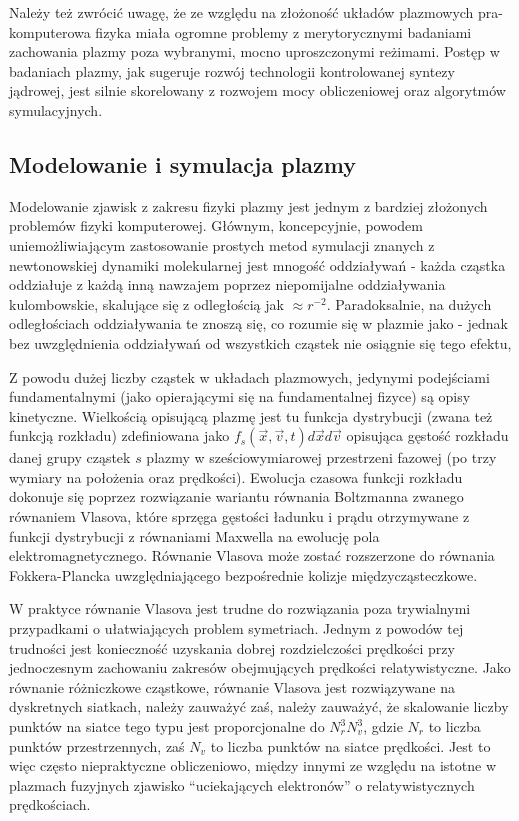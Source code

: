     Należy też zwrócić uwagę, że ze względu na złożoność układów plazmowych
    pra-komputerowa fizyka miała ogromne problemy z merytorycznymi badaniami
    zachowania plazmy poza wybranymi, mocno uproszczonymi reżimami. Postęp w
    badaniach plazmy, jak sugeruje rozwój technologii kontrolowanej syntezy
    jądrowej, jest silnie skorelowany z %
    rozwojem mocy obliczeniowej oraz algorytmów symulacyjnych.\cite{youtube-plasma-algorithm-progress}

    \subsection{Modelowanie i symulacja plazmy}

    Modelowanie zjawisk z zakresu fizyki plazmy jest jednym z bardziej
    złożonych problemów fizyki komputerowej. Głównym, koncepcyjnie, powodem
    uniemożliwiającym zastosowanie prostych metod symulacji znanych z
    newtonowskiej dynamiki molekularnej jest mnogość oddziaływań - każda
    cząstka oddziałuje z każdą inną nawzajem poprzez niepomijalne oddziaływania
    kulombowskie, skalujące się z odległością jak
    $\approx r^{-2}$. Paradoksalnie, na dużych odległościach oddziaływania
    te znoszą się, co rozumie się w plazmie jako  - jednak
    bez uwzględnienia oddziaływań od wszystkich cząstek nie osiągnie się tego
    efektu,

    Z powodu dużej liczby cząstek w układach plazmowych, jedynymi podejściami
    fundamentalnymi (jako opierającymi się na fundamentalnej fizyce) są opisy
    kinetyczne. Wielkością opisującą plazmę jest tu funkcja dystrybucji (zwana
    też funkcją rozkładu) zdefiniowana jako $f_s(\vec{x}, \vec{v}, t) d\vec{x}
    d\vec{v}$ opisująca gęstość rozkładu danej grupy cząstek $s$ plazmy w
    sześciowymiarowej przestrzeni fazowej (po trzy wymiary na położenia oraz
    prędkości). Ewolucja czasowa funkcji rozkładu dokonuje się poprzez
    rozwiązanie wariantu równania Boltzmanna zwanego równaniem Vlasova,
    które sprzęga gęstości ładunku i prądu otrzymywane z funkcji dystrybucji
    z równaniami Maxwella na ewolucję pola elektromagnetycznego. Równanie
    Vlasova może zostać rozszerzone do równania Fokkera-Plancka uwzględniającego
    bezpośrednie kolizje międzycząsteczkowe.

    W praktyce równanie Vlasova jest trudne do rozwiązania poza trywialnymi
    przypadkami o ułatwiających problem symetriach.  Jednym z powodów tej
    trudności jest konieczność uzyskania dobrej rozdzielczości prędkości przy
    jednoczesnym zachowaniu zakresów obejmujących prędkości relatywistyczne.
    Jako równanie różniczkowe cząstkowe, równanie Vlasova jest rozwiązywane na
    dyskretnych siatkach, należy zauważyć zaś, należy zauważyć, że skalowanie
    liczby punktów na siatce tego typu jest proporcjonalne do $N_r^3 N_v^3$,
    gdzie $N_r$ to liczba punktów przestrzennych, zaś $N_v$ to liczba punktów
    na siatce prędkości. Jest to więc często niepraktyczne obliczeniowo,
    między innymi ze względu na istotne w plazmach fuzyjnych zjawisko
    ``uciekających elektronów'' o relatywistycznych prędkościach.

